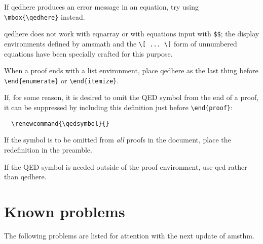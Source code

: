 \documentclass[11pt,twoside]{article}
\newcommand{\ntt}{%
  \fontfamily\ttdefault \fontseries\mddefault \fontshape\updefault
  \selectfont
}
\DeclareRobustCommand{\cn}[1]{{\ntt\bslchar#1}}
\DeclareRobustCommand{\pkg}[1]{{\ntt#1}}
\DeclareRobustCommand{\env}[1]{{\ntt#1}}
\providecommand{\qedsymbol}{\leavevmode
  \hbox to.77778em{%
  \hfil\vrule
  \vbox to.675em{\hrule width.6em\vfil\hrule}%
  \vrule\hfil}}
\begin{document}
If \cn{qedhere} produces an error message in an equation, try using \\
\verb+\mbox{\qedhere}+ instead.

\cn{qedhere} does not work with \env{eqnarray} or with equations input
with \verb+$$+; the display environments defined by \pkg{amsmath} and
the \verb+\[ ... \]+ form of unnumbered equations have been specially
crafted for this purpose.

When a proof ends with a list environment, place \cn{qedhere} as the
last thing before \verb+\end{enumerate}+ or \verb+\end{itemize}+.

If, for some reason, it is desired to omit the QED symbol from the
end of a proof, it can be suppressed by including this definition just
before \verb+\end{proof}+:
\begin{verbatim}
  \renewcommand{\qedsymbol}{}
\end{verbatim}
If the symbol is to be omitted from \emph{all} proofs in the document,
place the redefinition in the preamble.

If the QED symbol is needed outside of the \env{proof} environment,
use \cn{qed} rather than \cn{qedhere}.


\newpage %

\section{Known problems}

The following problems are listed for attention with the next update
of \pkg{amsthm}.
\end{document}
